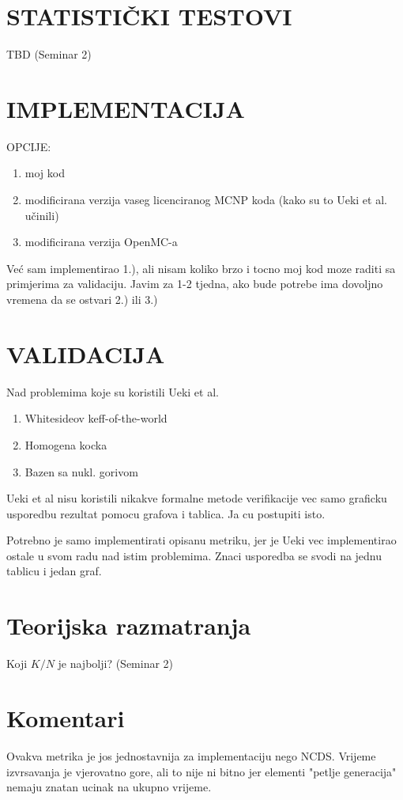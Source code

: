 \documentclass{report}
\begin{document}
\section{STATISTIČKI TESTOVI}
TBD (Seminar 2)

\section{IMPLEMENTACIJA}
OPCIJE:
\begin{enumerate}[label=\arabic*)]
	\item moj kod
	\item modificirana verzija vaseg licenciranog MCNP koda (kako su to Ueki et al. učinili)
	\item modificirana verzija OpenMC-a
\end{enumerate}

Već sam implementirao 1.), ali nisam koliko brzo i tocno moj kod moze raditi sa primjerima za validaciju.
Javim za 1-2 tjedna, ako bude potrebe ima dovoljno vremena da se ostvari 2.) ili 3.)

\section{VALIDACIJA}
Nad problemima koje su koristili Ueki et al.
\begin{enumerate}
\item Whitesideov keff-of-the-world
\item Homogena kocka
\item Bazen sa nukl. gorivom
\end{enumerate}

Ueki et al nisu koristili nikakve formalne metode verifikacije
vec samo graficku usporedbu rezultat pomocu grafova i tablica.
Ja cu postupiti isto.

Potrebno je samo implementirati opisanu metriku, jer je Ueki vec
implementirao ostale u svom radu nad istim problemima.
Znaci usporedba se svodi na jednu tablicu i jedan graf.

\section{Teorijska razmatranja}
Koji $K/N$ je najbolji? (Seminar 2)



\pagebreak
\section*{Komentari}
Ovakva metrika je jos jednostavnija za implementaciju nego NCDS.
Vrijeme izvrsavanja je vjerovatno gore, ali to nije ni bitno jer elementi "petlje generacija"
nemaju znatan ucinak na ukupno vrijeme.
\end{document}
